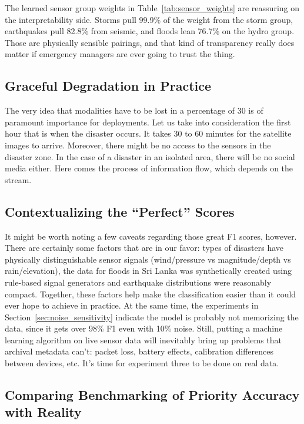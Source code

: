 \documentclass[journal]{IEEEtran}
\begin{document}
The learned sensor group weights in Table~\ref{tab:sensor_weights} are reassuring on the interpretability side. Storms pull 99.9\% of the weight from the storm group, earthquakes pull 82.8\% from seismic, and floods lean 76.7\% on the hydro group. Those are physically sensible pairings, and that kind of transparency really does matter if emergency managers are ever going to trust the thing.

\subsection{Graceful Degradation in Practice}

The very idea that modalities have to be lost in a percentage of 30 is of paramount importance for deployments. Let us take into consideration the first hour that is when the disaster occurs. It takes 30 to 60 minutes for the satellite images to arrive. Moreover, there might be no access to the sensors in the disaster zone. In the case of a disaster in an isolated area, there will be no social media either. Here comes the process of information flow, which depends on the stream.

\subsection{Contextualizing the ``Perfect'' Scores}

It might be worth noting a few caveats regarding those great F1 scores, however. There are certainly some factors that are in our favor: types of disasters have physically distinguishable sensor signals (wind/pressure vs magnitude/depth vs rain/elevation), the data for floods in Sri Lanka was synthetically created using rule-based signal generators and earthquake distributions were reasonably compact. Together, these factors help make the classification easier than it could ever hope to achieve in practice. At the same time, the experiments in Section~\ref{sec:noise_sensitivity} indicate the model is probably not memorizing the data, since it gets over 98\% F1 even with 10\% noise. Still, putting a machine learning algorithm on live sensor data will inevitably bring up problems that archival metadata can't: packet loss, battery effects, calibration differences between devices, etc. It's time for experiment three to be done on real data.

\subsection{Comparing Benchmarking of Priority Accuracy with Reality}
\end{document}

